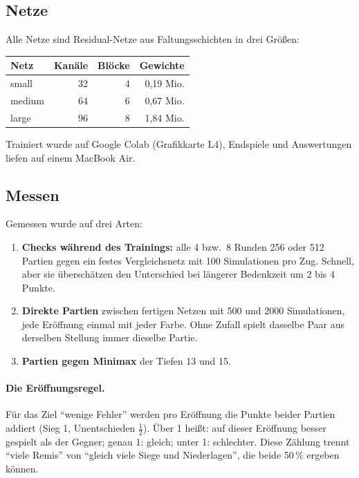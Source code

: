 \documentclass[11pt,a4paper]{article}
\begin{document}
\subsection{Netze}

Alle Netze sind Residual-Netze aus Faltungsschichten in drei Größen:

\begin{center}
\begin{tabular}{lrrr}
\toprule
Netz & Kanäle & Blöcke & Gewichte \\
\midrule
small  & 32 & 4 & 0{,}19 Mio. \\
medium & 64 & 6 & 0{,}67 Mio. \\
large  & 96 & 8 & 1{,}84 Mio. \\
\bottomrule
\end{tabular}
\end{center}

\noindent Trainiert wurde auf Google Colab (Grafikkarte L4), Endspiele und Auswertungen liefen auf einem
MacBook Air.

\subsection{Messen}

Gemessen wurde auf drei Arten:

\begin{enumerate}
\item \textbf{Checks während des Trainings:} alle 4 bzw.\ 8 Runden 256 oder 512 Partien gegen ein festes
Vergleichsnetz mit 100 Simulationen pro Zug. Schnell, aber sie überschätzen den Unterschied bei längerer
Bedenkzeit um 2 bis 4 Punkte.
\item \textbf{Direkte Partien} zwischen fertigen Netzen mit 500 und 2000 Simulationen, jede Eröffnung
einmal mit jeder Farbe. Ohne Zufall spielt dasselbe Paar aus derselben Stellung immer dieselbe Partie.
\item \textbf{Partien gegen Minimax} der Tiefen 13 und 15.
\end{enumerate}

\paragraph{Die Eröffnungsregel.} Für das Ziel \enquote{wenige Fehler} werden pro Eröffnung die Punkte beider
Partien addiert (Sieg 1, Unentschieden $\tfrac12$). Über 1 heißt: auf dieser Eröffnung besser
gespielt als der Gegner; genau 1: gleich; unter 1: schlechter. Diese Zählung trennt \enquote{viele Remis} von
\enquote{gleich viele Siege und Niederlagen}, die beide 50\,\% ergeben können.
\end{document}
